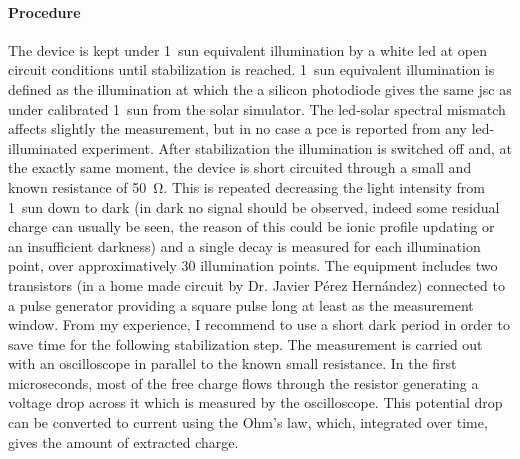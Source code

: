 	
	\paragraph{Procedure} The device is kept under 1~sun equivalent illumination by a white \gls{led} at open circuit conditions until stabilization is reached. 1~sun equivalent illumination is defined as the illumination at which the a silicon photodiode gives the same \gls{jsc} as under calibrated 1~sun from the solar simulator. The \gls{led}-solar spectral mismatch affects slightly the measurement, but in no case a \gls{pce} is reported from any \gls{led}-illuminated experiment. After stabilization the illumination is switched off and, at the exactly same moment, the device is short circuited through a small and known resistance of \SI{50}{\ohm}.
	This is repeated decreasing the light intensity from 1~sun down to dark (in dark no signal should be observed, indeed some residual charge can usually be seen, the reason of this could be ionic profile updating or an insufficient darkness) and a single decay is measured for each illumination point, over approximatively 30 illumination points.
	The equipment includes two transistors (in a home made circuit by Dr. Javier Pérez Hernández) connected to a pulse generator providing a square pulse long at least as the measurement window. From my experience, I recommend to use a short dark period in order to save time for the following stabilization step.
	The measurement is carried out with an oscilloscope in parallel to the known small resistance. In the first microseconds, most of the free charge flows through the resistor generating a voltage drop across it which is measured by the oscilloscope. This potential drop can be converted to current using the Ohm's law, which, integrated over time, gives the amount of extracted charge.

